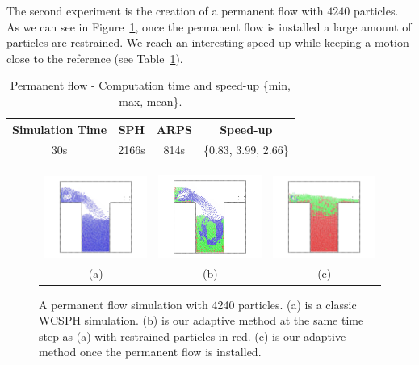 The second experiment is the creation of a permanent flow with $4240$ particles. As we can see in Figure~\ref{fig:permanentflow}, once the permanent flow is installed a large amount of particles are restrained. 
We reach an interesting speed-up while keeping a motion close to the reference (see Table~\ref{table:perf2}).

\begin{table}[h!]
	\centering
	\begin{tabular}{|c|c|c|c|} \hline
		Simulation Time & SPH       & ARPS    & Speed-up \\ \hline
		30s         & 2166s     & 814s              & \{0.83, 3.99, 2.66\} \\ \hline
	\end{tabular}
	\caption[ARPS: Permanent flow - Measurements]{\label{table:perf2}Permanent flow - Computation time and speed-up \small{\{min, max, mean\}}.}
\end{table}

\newpage 

\begin{figure}[!h]
	\centering
	\begin{tabular}{ccc}
		\includegraphics[width=.32\linewidth]{images/arps-vriphys2013/PermanentFlowSPH.jpg} &
		\includegraphics[width=.32\linewidth]{images/arps-vriphys2013/PermanentFlowARPSColor.jpg} &
		\includegraphics[width=.32\linewidth]{images/arps-vriphys2013/PermanentFlowARPSColor2.jpg} \\
		(a) & (b) & (c)
	\end{tabular}
	\caption[ARPS: Permanent flow simulations]{\label{fig:permanentflow} A permanent flow simulation with 4240 particles.
		(a) is a classic WCSPH simulation. (b) is our adaptive method at the same time step as (a) with restrained particles in red. (c) is our adaptive method once the permanent flow is installed.}
\end{figure}

